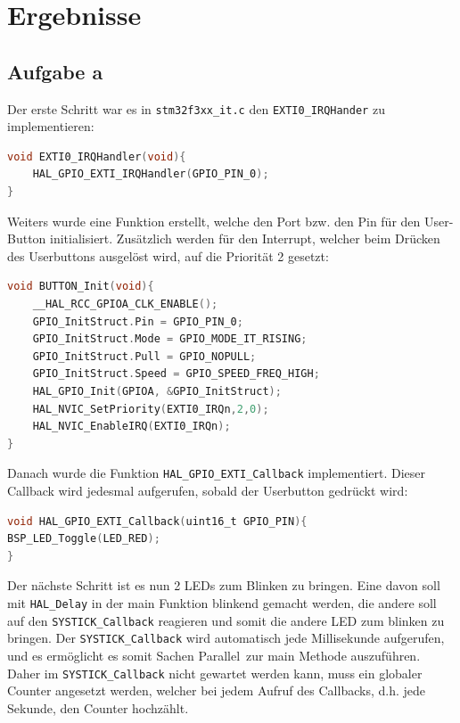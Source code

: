 
\section{Ergebnisse}
\subsection{Aufgabe a}
Der erste Schritt war es in \verb|stm32f3xx_it.c| den \verb|EXTI0_IRQHander| zu implementieren:

\begin{lstlisting}[language=C]
void EXTI0_IRQHandler(void){
	HAL_GPIO_EXTI_IRQHandler(GPIO_PIN_0);
}	
\end{lstlisting}

Weiters wurde eine Funktion erstellt, welche den Port bzw. den Pin für den User-Button initialisiert. Zusätzlich werden für den Interrupt, welcher beim Drücken des Userbuttons ausgelöst wird, auf die Priorität 2 gesetzt:

\begin{lstlisting}[language=C]
void BUTTON_Init(void){
	__HAL_RCC_GPIOA_CLK_ENABLE();
	GPIO_InitStruct.Pin = GPIO_PIN_0;
	GPIO_InitStruct.Mode = GPIO_MODE_IT_RISING;
	GPIO_InitStruct.Pull = GPIO_NOPULL;
	GPIO_InitStruct.Speed = GPIO_SPEED_FREQ_HIGH;
	HAL_GPIO_Init(GPIOA, &GPIO_InitStruct);
	HAL_NVIC_SetPriority(EXTI0_IRQn,2,0);
	HAL_NVIC_EnableIRQ(EXTI0_IRQn);
}
\end{lstlisting}

Danach wurde die Funktion \verb|HAL_GPIO_EXTI_Callback| implementiert. Dieser Callback wird jedesmal aufgerufen, sobald der Userbutton gedrückt wird:

\begin{lstlisting}[language=C]
void HAL_GPIO_EXTI_Callback(uint16_t GPIO_PIN){
BSP_LED_Toggle(LED_RED);
}
\end{lstlisting}

Der nächste Schritt ist es nun 2 LEDs zum Blinken zu bringen. Eine davon soll mit \verb|HAL_Delay| in der main Funktion blinkend gemacht werden, die andere soll auf den \verb|SYSTICK_Callback| reagieren und somit die andere LED zum blinken zu bringen. Der \verb|SYSTICK_Callback| wird automatisch jede Millisekunde aufgerufen, und es ermöglicht es somit Sachen \glqq Parallel\grqq\ zur main Methode auszuführen. Daher im \verb|SYSTICK_Callback| nicht gewartet werden kann, muss ein globaler Counter angesetzt werden, welcher bei jedem Aufruf des Callbacks, d.h. jede Sekunde, den Counter hochzählt.

